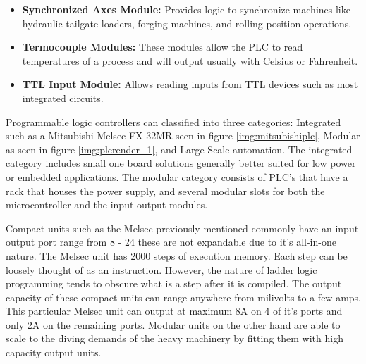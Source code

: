 \begin{itemize}
	\item \textbf{Synchronized Axes Module:} Provides logic to synchronize machines like hydraulic tailgate loaders, forging machines, and rolling-position operations.
	\item \textbf{Termocouple Modules:} These modules allow the PLC to read temperatures of a process and will output usually with Celsius or Fahrenheit.
	\item \textbf{TTL Input Module:} Allows reading inputs from TTL devices such as most integrated circuits.
\end{itemize}

Programmable logic controllers can classified into three categories: Integrated such as a Mitsubishi Melsec FX-32MR seen in figure \ref{img:mitsubishiplc}, Modular as seen in figure \ref{img:plcrender_1}, and Large Scale automation. The integrated category includes small one board solutions generally better suited for low power or embedded applications. The modular category consists of PLC's that have a rack that houses the power supply, and several modular slots for both the microcontroller and the input output modules.

Compact units such as the Melsec previously mentioned commonly have an input output port range from 8 - 24 these are not expandable due to it's all-in-one nature. The Melsec unit has 2000 steps of execution memory. Each step can be loosely thought of as an instruction. However, the nature of ladder logic programming tends to obscure what is a step after it is compiled. The output capacity of these compact units can range anywhere from milivolts to a few amps. This particular Melsec unit can output at maximum 8A on 4 of it's ports and only 2A on the remaining ports. Modular units on the other hand are able to scale to the diving demands of the heavy machinery by fitting them with high capacity output units.

